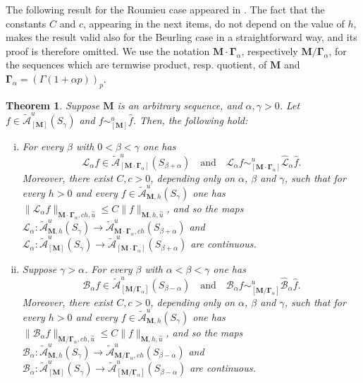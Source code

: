 \documentclass[11pt,a4paper]{article}
\theoremstyle{plain}
\newtheorem{theorem}{Theorem}[section]
\theoremstyle{definition}
\numberwithin{equation}{section}
\newcommand{\al}{\alpha}
\newcommand{\be}{\beta}
\newcommand{\M}{{\boldsymbol{M}}}
\newcommand{\bGa}{{\boldsymbol{\Gamma}}}
\begin{document}
The following result for the Roumieu case appeared in \cite[Th. 3.5]{JimenezSanzSchindlSurjectDC}. The fact that the constants $C$ and $c$, appearing in the next items, do not depend on the value of $h$, makes the result valid also for the Beurling case in a straightforward way, and its proof is therefore omitted. We use the notation $\M\cdot\bGa_{\al}$, respectively $\M/\bGa_{\al}$, for the sequences which are termwise product, resp. quotient, of $\M$ and $\bGa_{\al}=(\Gamma(1+\al p))_p$.

\begin{theorem}
\label{teorrelacdesartransfBL}
	Suppose $\M$ is an arbitrary sequence, and $\al,\gamma>0$. Let $f\in\widetilde{\mathcal{A}}^{u}_{[\M]}(S_\gamma)$
	and $f\sim^u_{[\M]}\widehat{f}$. Then, the following hold:
	\begin{enumerate}[(i)]
		\item For every $\be$ with $0<\be<\gamma$ one has $$\mathcal{L}_{\al}f\in \widetilde{\mathcal{A}}^{u}_{[\M\cdot\bGa_{\al}]}(S_{\be+\al}) \quad\textrm{and}\quad  \mathcal{L}_{\al}f\sim^u_{[\M\cdot\bGa_{\al}]} \widehat{\mathcal{L}}_{\al}\widehat{f}.
		$$
		Moreover, there exist $C,c>0$, depending only on $\al$, $\be$ and $\gamma$, such that for every $h>0$ and every $f\in\widetilde{\mathcal{A}}^{u}_{\M,h}(S_\gamma)$ one has
		 $\|\mathcal{L}_{\al}f\|_{\M\cdot\bGa_{\al},ch,\overset{\sim}{u}}\le C\|f\|_{\M,h,\overset{\sim}{u}}$, and so the maps $\mathcal{L}_{\al}\colon \widetilde{\mathcal{A}}^{u}_{\M,h}(S_\gamma)\to \widetilde{\mathcal{A}}^{u}_{\M\cdot\bGa_{\al},ch}(S_{\be+\al})$ and $\mathcal{L}_{\al}\colon \widetilde{\mathcal{A}}^{u}_{[\M]}(S_\gamma)\to \widetilde{\mathcal{A}}^{u}_{[\M\cdot\bGa_{\al}]}(S_{\be+\al})$ are continuous.
		\item Suppose $\gamma>\al$. For every $\be$ with $\al<\be<\gamma$ one has
		$$\mathcal{B}_{\al}f\in \widetilde{\mathcal{A}}^{u}_{[\M/\bGa_{\al}]}(S_{\be-\al})\quad \textrm{and}\quad \mathcal{B}_{\al}f\sim^u_{[\M/\bGa_{\al}]} \widehat{\mathcal{B}}_{\al}\widehat{f}.
		$$
		Moreover, there exist $C,c>0$, depending only on $\al$, $\be$ and $\gamma$, such that for every $h>0$ and every $f\in\widetilde{\mathcal{A}}^{u}_{\M,h}(S_\gamma)$ one has
		 $\|\mathcal{B}_{\al}f\|_{\M/\bGa_{\al},ch,\overset{\sim}{u}}\le C\|f\|_{\M,h,\overset{\sim}{u}}$, and so the maps $\mathcal{B}_{\al}\colon \widetilde{\mathcal{A}}^{u}_{\M,h}(S_\gamma)\to \widetilde{\mathcal{A}}^{u}_{\M/\bGa_{\al},ch}(S_{\be-\al})$ and $\mathcal{B}_{\al}\colon \widetilde{\mathcal{A}}^{u}_{[\M]}(S_\gamma)\to \widetilde{\mathcal{A}}^{u}_{[\M/\bGa_{\al}]}(S_{\be-\al})$ are continuous.
	\end{enumerate}
\end{theorem}
\end{document}
